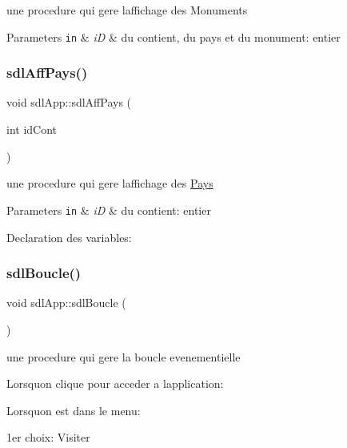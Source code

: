 une procedure qui gere l\textquotesingle{}affichage des Monuments 


\begin{DoxyParams}[1]{Parameters}
\mbox{\tt in}  & {\em iD} & du contient, du pays et du monument\+: entier \\
\hline
\end{DoxyParams}
\mbox{\label{classsdlApp_a02c12de36e42e60a8978458ef62fa762}} 
\subsubsection{\texorpdfstring{sdl\+Aff\+Pays()}{sdlAffPays()}}
{\footnotesize\ttfamily void sdl\+App\+::sdl\+Aff\+Pays (\begin{DoxyParamCaption}\item[{int}]{id\+Cont }\end{DoxyParamCaption})}



une procedure qui gere l\textquotesingle{}affichage des \mbox{\hyperlink{classPays}{Pays}} 


\begin{DoxyParams}[1]{Parameters}
\mbox{\tt in}  & {\em iD} & du contient\+: entier \\
\hline
\end{DoxyParams}
Declaration des variables\+: \mbox{\label{classsdlApp_a535e9ab849788dcc9028383b64990744}} 
\subsubsection{\texorpdfstring{sdl\+Boucle()}{sdlBoucle()}}
{\footnotesize\ttfamily void sdl\+App\+::sdl\+Boucle (\begin{DoxyParamCaption}{ }\end{DoxyParamCaption})}



une procedure qui gere la boucle evenementielle 

Lorsqu\textquotesingle{}on clique pour acceder a l\textquotesingle{}application\+:

Lorsqu\textquotesingle{}on est dans le menu\+:

1er choix\+: Visiter

